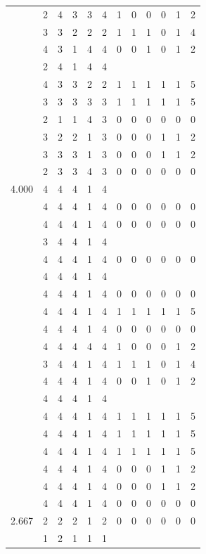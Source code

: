 \documentclass[]{book}
\theoremstyle{definition}
\theoremstyle{definition}
\theoremstyle{definition}
\theoremstyle{remark}
\begin{document}
\begin{table}
{\begin{tabular}[t]{rrrrrrrrrrrr}
 & 2 & 4 & 3 & 3 & 4 & 1 & 0 & 0 & 0 & 1 & 2\\
 & 3 & 3 & 2 & 2 & 2 & 1 & 1 & 1 & 0 & 1 & 4\\
 & 4 & 3 & 1 & 4 & 4 & 0 & 0 & 1 & 0 & 1 & 2\\
 & 2 & 4 & 1 & 4 & 4 &  &  &  &  &  & \\
 & 4 & 3 & 3 & 2 & 2 & 1 & 1 & 1 & 1 & 1 & 5\\
 & 3 & 3 & 3 & 3 & 3 & 1 & 1 & 1 & 1 & 1 & 5\\
 & 2 & 1 & 1 & 4 & 3 & 0 & 0 & 0 & 0 & 0 & 0\\
 & 3 & 2 & 2 & 1 & 3 & 0 & 0 & 0 & 1 & 1 & 2\\
 & 3 & 3 & 3 & 1 & 3 & 0 & 0 & 0 & 1 & 1 & 2\\
 & 2 & 3 & 3 & 4 & 3 & 0 & 0 & 0 & 0 & 0 & 0\\
4.000 & 4 & 4 & 4 & 1 & 4 &  &  &  &  &  & \\
 & 4 & 4 & 4 & 1 & 4 & 0 & 0 & 0 & 0 & 0 & 0\\
 & 4 & 4 & 4 & 1 & 4 & 0 & 0 & 0 & 0 & 0 & 0\\
 & 3 & 4 & 4 & 1 & 4 &  &  &  &  &  & \\
 & 4 & 4 & 4 & 1 & 4 & 0 & 0 & 0 & 0 & 0 & 0\\
 & 4 & 4 & 4 & 1 & 4 &  &  &  &  &  & \\
 & 4 & 4 & 4 & 1 & 4 & 0 & 0 & 0 & 0 & 0 & 0\\
 & 4 & 4 & 4 & 1 & 4 & 1 & 1 & 1 & 1 & 1 & 5\\
 & 4 & 4 & 4 & 1 & 4 & 0 & 0 & 0 & 0 & 0 & 0\\
 & 4 & 4 & 4 & 4 & 4 & 1 & 0 & 0 & 0 & 1 & 2\\
 & 3 & 4 & 4 & 1 & 4 & 1 & 1 & 1 & 0 & 1 & 4\\
 & 4 & 4 & 4 & 1 & 4 & 0 & 0 & 1 & 0 & 1 & 2\\
 & 4 & 4 & 4 & 1 & 4 &  &  &  &  &  & \\
 & 4 & 4 & 4 & 1 & 4 & 1 & 1 & 1 & 1 & 1 & 5\\
 & 4 & 4 & 4 & 1 & 4 & 1 & 1 & 1 & 1 & 1 & 5\\
 & 4 & 4 & 4 & 1 & 4 & 1 & 1 & 1 & 1 & 1 & 5\\
 & 4 & 4 & 4 & 1 & 4 & 0 & 0 & 0 & 1 & 1 & 2\\
 & 4 & 4 & 4 & 1 & 4 & 0 & 0 & 0 & 1 & 1 & 2\\
 & 4 & 4 & 4 & 1 & 4 & 0 & 0 & 0 & 0 & 0 & 0\\
2.667 & 2 & 2 & 2 & 1 & 2 & 0 & 0 & 0 & 0 & 0 & 0\\
 & 1 & 2 & 1 & 1 & 1 &  &  &  &  &  & \\

\end{tabular}}
\end{table}
\end{document}
